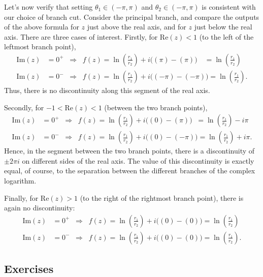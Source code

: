 \documentclass[10pt,a4paper]{article}
\begin{document}
Let's now verify that setting $\theta_1 \in (-\pi,\pi)$ and
$\theta_2 \in (-\pi,\pi)$ is consistent with our choice of branch cut.
Consider the principal branch, and compare the outputs of the above
formula for $z$ just above the real axis, and for $z$ just below the
real axis. There are three cases of interest. Firstly, for
$\mathrm{Re}(z) < 1$ (to the left of the leftmost branch point),
\begin{align}
  \mathrm{Im}(z) &= 0^+ \;\;\Rightarrow\;\; f(z) = \ln\left(\frac{r_1}{r_2}\right) + i\Big((\pi) - (\pi)\Big) \quad = \ln\left(\frac{r_1}{r_2}\right) \\ \mathrm{Im}(z) &= 0^- \;\;\Rightarrow \;\; f(z) = \ln\left(\frac{r_1}{r_2}\right) + i\Big((-\pi) - (-\pi)\Big) = \ln\left(\frac{r_1}{r_2}\right).
\end{align}
Thus, there is no discontinuity along this segment of the real axis.

Secondly, for $-1 < \mathrm{Re}(z) < 1$ (between the two branch
points),
\begin{align}
  \mathrm{Im}(z) &= 0^+ \;\;\Rightarrow\;\; f(z) = \ln\left(\frac{r_1}{r_2}\right) + i\Big((0) - (\pi)\Big) \;\;= \ln\left(\frac{r_1}{r_2}\right) -i\pi \\ \mathrm{Im}(z) &= 0^- \;\;\Rightarrow\;\; f(z) = \ln\left(\frac{r_1}{r_2}\right) + i\Big((0) - (-\pi)\Big) = \ln\left(\frac{r_1}{r_2}\right) + i\pi.
\end{align}
Hence, in the segment between the two branch points, there is a
discontinuity of $\pm 2\pi i$ on different sides of the real axis. The
value of this discontinuity is exactly equal, of course, to the
separation between the different branches of the complex logarithm.

Finally, for $\mathrm{Re}(z) > 1$ (to the right of the rightmost
branch point), there is again no discontinuity:
\begin{align}
  \mathrm{Im}(z) &= 0^+ \;\;\Rightarrow\;\; f(z) = \ln\left(\frac{r_1}{r_2}\right) + i\Big((0) - (0)\Big) = \ln\left(\frac{r_1}{r_2}\right) \\ \mathrm{Im}(z) &= 0^- \;\;\Rightarrow\;\; f(z) = \ln\left(\frac{r_1}{r_2}\right) + i\Big((0) - (0)\Big) = \ln\left(\frac{r_1}{r_2}\right).
\end{align}

\subsection{Exercises}\label{exercises}
\end{document}
